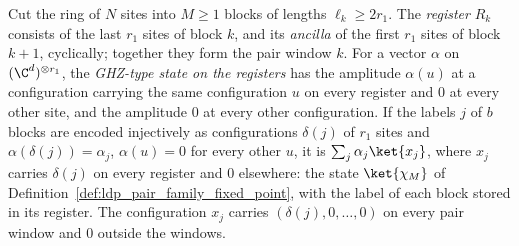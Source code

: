 \begin{definition}
    \label{def:ldp_window_ghz_state}
    \leanok
    Cut the ring of $N$ sites into $M\geq1$ blocks of lengths
    $\ell_k\geq2r_1$. The \emph{register} $R_k$ consists of the last $r_1$
    sites of block $k$, and its \emph{ancilla} of the first $r_1$ sites of
    block $k+1$, cyclically; together they form the pair window $k$. For a
    vector $\alpha$ on $(\C^d)^{\otimes r_1}$, the \emph{GHZ-type state on the
        registers} has the amplitude $\alpha(u)$ at a configuration carrying the
    same configuration $u$ on every register and $0$ at every other site, and
    the amplitude $0$ at every other configuration. If the labels $j$ of $b$
    blocks are encoded injectively as configurations $\delta(j)$ of $r_1$ sites
    and $\alpha(\delta(j))=\alpha_j$, $\alpha(u)=0$ for every other $u$, it is
    $\sum_j\alpha_j\ket{x_j}$, where $x_j$ carries $\delta(j)$ on every register
    and $0$ elsewhere: the state $\ket{\chi_M}$ of
    Definition~\ref{def:ldp_pair_family_fixed_point}, with the label of each
    block stored in its register. The configuration $x_j$ carries
    $(\delta(j),0,\dots,0)$ on every pair window and $0$ outside the windows.
\end{definition}


